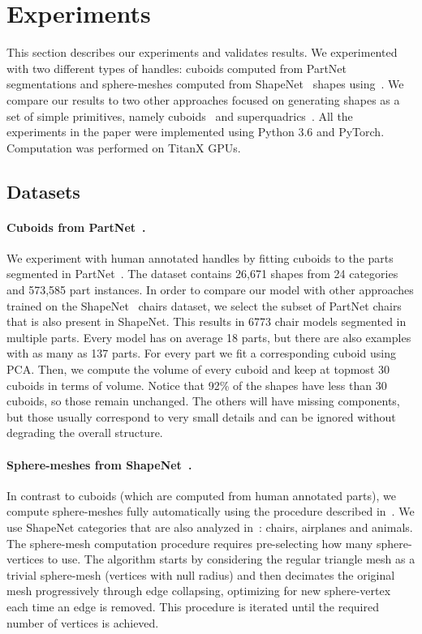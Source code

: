 \section{Experiments}
\label{sec:experiments}

This section describes our experiments and validates results.
We experimented with two different types of handles:
cuboids computed from PartNet~\cite{partnet} segmentations and
sphere-meshes computed from ShapeNet~\cite{shapenet} shapes using~\cite{spheremesh}.
We compare our results to two other approaches focused on generating shapes
as a set of simple primitives, namely cuboids~\cite{Tulsiani2017} 
and superquadrics~\cite{Paschalidou2019}.
All the experiments in the paper were implemented using Python 3.6
and PyTorch.
Computation was performed on TitanX GPUs.

\subsection{Datasets}
\paragraph*{Cuboids from PartNet~\cite{partnet}.}
We experiment with human annotated handles by fitting cuboids to the parts
segmented in PartNet~\cite{partnet}.
The dataset contains 26,671 shapes from 24 categories and 573,585 part instances.
In order to compare our model with other approaches trained
on the ShapeNet~\cite{shapenet} chairs dataset, we select the subset of PartNet chairs
that is also present in ShapeNet.
This results in 6773 chair models segmented in multiple parts.
Every model has on average 18 parts, but there are also examples with as many as 137 parts.
For every part we fit a corresponding cuboid using PCA. 
Then, we compute the volume of every cuboid and keep at topmost 30 cuboids in terms of volume.
Notice that 92\% of the shapes have less than 30 cuboids, so those remain unchanged.
The others will have missing components, but those usually correspond to very small details
and can be ignored without degrading the overall structure.

\paragraph*{Sphere-meshes from ShapeNet~\cite{shapenet}.}
In contrast to cuboids (which are computed from human annotated parts), we compute sphere-meshes fully automatically using the procedure
described in~\cite{spheremesh}.
We use ShapeNet categories that are also analyzed in~\cite{Paschalidou2019, Tulsiani2017}:
chairs, airplanes and animals.
The sphere-mesh computation procedure requires pre-selecting how many sphere-vertices to use.
The algorithm starts by considering the regular triangle mesh as a trivial sphere-mesh (vertices with null radius) and then decimates the
original mesh progressively through edge collapsing, optimizing for new sphere-vertex each time an edge is removed.
This procedure is iterated until the required number of vertices is achieved.

